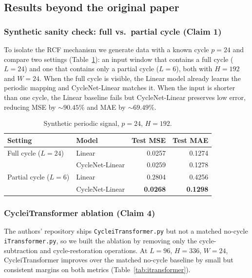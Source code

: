 \documentclass[10pt]{article}
\begin{document}
\subsection{Results beyond the original paper}

\subsubsection{Synthetic sanity check: full vs.\ partial cycle (Claim 1)}

To isolate the RCF mechanism we generate data with a known cycle $p{=}24$ and compare two settings (Table~\ref{tab:synth}): an input window that contains a full cycle ($L{=}24$) and one that contains only a partial cycle ($L{=}6$), both with $H{=}192$ and $W{=}24$. When the full cycle is visible, the Linear model already learns the periodic mapping and CycleNet-Linear matches it. When the input is shorter than one cycle, the Linear baseline fails but CycleNet-Linear preserves low error, reducing MSE by ${\sim}90.45\%$ and MAE by ${\sim}69.49\%$.

\begin{table}[h]
\centering
\caption{Synthetic periodic signal, $p{=}24$, $H{=}192$.}
\label{tab:synth}
\begin{tabular}{llrr}
\toprule
Setting & Model & Test MSE & Test MAE \\
\midrule
Full cycle ($L{=}24$)    & Linear          & 0.0257 & 0.1274 \\
                          & CycleNet-Linear & 0.0259 & 0.1278 \\
\midrule
Partial cycle ($L{=}6$)  & Linear          & 0.2804 & 0.4256 \\
                          & CycleNet-Linear & \textbf{0.0268} & \textbf{0.1298} \\
\bottomrule
\end{tabular}
\end{table}

\subsubsection{CycleiTransformer ablation (Claim 4)}

The authors' repository ships \texttt{CycleiTransformer.py} but not a matched no-cycle \texttt{iTransformer.py}, so we built the ablation by removing only the cycle-subtraction and cycle-restoration operations. At $L{=}96$, $H{=}336$, $W{=}24$, CycleiTransformer improves over the matched no-cycle baseline by small but consistent margins on both metrics (Table~\ref{tab:itransformer}).
\end{document}
